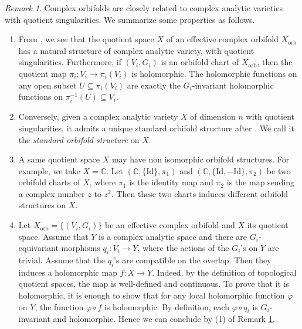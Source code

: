 \documentclass[12pt]{amsart}
\newcommand{\<}{\leq}
\theoremstyle{remark}
\newtheorem{remark}[theorem]{Remark}
\theoremstyle{definition}
\theoremstyle{definition}
\numberwithin{equation}{section}
\theoremstyle{definition}
\theoremstyle{definition}
\def\orb{\mathrm{orb}}
\begin{document}
\begin{remark}\label{rmk:quotient-singularities}
Complex orbifolds are closely related to complex analytic varieties with quotient singularities. 
We summarize  some properties as follows.

\begin{enumerate}
\item From  \cite[Th\'eor\`eme 4]{Cartan1957}, we see that the 
quotient space $X$ of an effective complex orbifold $X_{\orb}$ has a natural structure of complex analytic variety, with  quotient singularities. 
Furthermore, if $(V_i,G_i)$ is an orbifold chart of $X_{\orb}$, then the quotient map $\pi_i\colon V_i \to \pi_i(V_i)$ is holomorphic. 
The   holomorphic functions on any open subset $U\subseteq \pi_i(V_i)$ are exactly the $G_i$-invariant holomorphic functions on $\pi_i^{-1}(U)\subseteq V_i$.



\item Conversely, given  a complex analytic variety $X$ of dimension $n$ with quotient singularities,  it admits a unique standard orbifold structure   after \cite[Theorem 1]{Prill1967}.  
We call it  the \textit{standard orbifold structure} on $X$.

\item A same quotient space $X$ may have non isomorphic orbifold structures.  For example, we take $X = \mathbb{C}$. 
Let $( \mathbb{C}, \{\mathrm{Id}\}, \pi_1 )$ and $( \mathbb{C}, \{\mathrm{Id}, -\mathrm{Id}\}, \pi_2)$ be two orbifold charts of $X$, where $\pi_1$ is the identity map and $\pi_2$ is the   map sending a complex number $z$ to $z^2$. 
Then these two charts induces different orbifold structures on $X$.


\item  Let $X_{\orb}= \{(V_i,G_i)\}$ be an effective complex orbifold and $X$ its quotient space. 
Assume that $Y$ is a complex analytic space and there are $G_i$-equivariant morphisms $q_i\colon V_i\to Y$, 
where the actions of the $G_i$'s on $Y$ are trivial. 
Assume that   the $q_i$'s are compatible on the overlap. 
Then they induces a holomorphic map $f\colon X\to Y$. 
Indeed, by the definition of topological quotient spaces, the map is   well-defined and continuous. 
To prove that it is holomorphic, it is enough to show that for any local holomorphic function $\varphi$ on $Y$, the function  $\varphi\circ f$ is holomorphic.  
By definition, each $\varphi\circ q_i$ is  $G_i$-invariant and holomorphic. 
Hence we can conclude by (1) of  Remark \ref{rmk:quotient-singularities}. 
  

\end{enumerate}
\end{remark}
\end{document}
